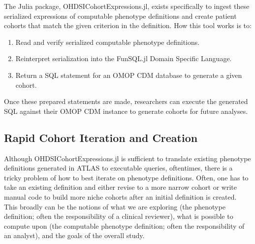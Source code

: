 \documentclass{juliacon}
\begin{document}

The Julia package, OHDSICohortExpressions.jl, exists specifically to ingest these serialized expressions of computable phenotype definitions and create patient cohorts that match the given criterion in the definition. \cite{evansOHDSICohortExpressionsJl2023}
How this tool works is to:

\begin{enumerate}

\item Read and verify serialized computable phenotype definitions.

\item Reinterpret serialization into the FunSQL.jl Domain Specific Language.

\item Return a SQL statement for an OMOP CDM database to generate a given cohort.

\end{enumerate}

Once these prepared statements are made, researchers can execute the generated SQL against their OMOP CDM instance to generate cohorts for future analyses.

\subsection{Rapid Cohort Iteration and Creation}

Although OHDSICohortExpressions.jl is sufficient to translate existing phenotype definitions generated in ATLAS to executable queries, oftentimes, there is a tricky problem of how to best iterate on phenotype definitions. \cite{zelkoDevelopingRobustComputable2023}
Often, one has to take an existing definition and either revise to a more narrow cohort or write manual code to build more niche cohorts after an initial definition is created.
This broadly can be the notions of what we are exploring (the phenotype definition; often the responsibility of a clinical reviewer), what is possible to compute upon (the computable phenotype definition; often the responsibility of an analyst), and the goals of the overall study.
\end{document}
